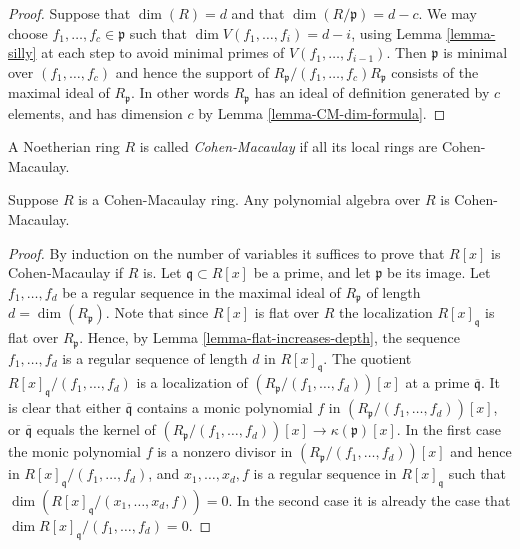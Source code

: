 \begin{proof}
Suppose that $\dim(R) = d$ and that $\dim(R/\mathfrak p) = d - c$.
We may choose $f_1, \ldots, f_c \in \mathfrak p$ such that
$\dim V(f_1, \ldots, f_i) = d - i$, using Lemma \ref{lemma-silly}
at each step to avoid minimal primes of $V(f_1, \ldots, f_{i-1})$.
Then $\mathfrak p$ is minimal over $(f_1, \ldots, f_c)$ and hence
the support of $R_{\mathfrak p}/(f_1, \ldots, f_c)R_{\mathfrak p}$ consists
of the maximal ideal of $R_{\mathfrak p}$. In other words
$R_{\mathfrak p}$ has an ideal of definition generated by
$c$ elements, and has dimension $c$ by Lemma \ref{lemma-CM-dim-formula}.
\end{proof}

\begin{definition}
\label{definition-ring-CM}
A Noetherian ring $R$ is called {\it Cohen-Macaulay} if all
its local rings are Cohen-Macaulay.
\end{definition}

\begin{lemma}
\label{lemma-CM-polynomial-algebra}
Suppose $R$ is a Cohen-Macaulay ring.
Any polynomial algebra over $R$ is Cohen-Macaulay.
\end{lemma}

\begin{proof}
By induction on the number of variables it suffices
to prove that $R[x]$ is Cohen-Macaulay if $R$ is.
Let $\mathfrak q \subset R[x]$ be a prime, and
let $\mathfrak p$ be its image.
Let $f_1, \ldots, f_d$ be a regular sequence
in the maximal ideal of $R_{\mathfrak p}$ of length
$d = \dim(R_{\mathfrak p})$. Note that since
$R[x]$ is flat over $R$ the localization
$R[x]_{\mathfrak q}$ is flat over $R_{\mathfrak p}$.
Hence, by Lemma \ref{lemma-flat-increases-depth}, the sequence
$f_1, \ldots, f_d$
is a regular sequence of length $d$ in $R[x]_{\mathfrak q}$.
The quotient $R[x]_{\mathfrak q}/(f_1, \ldots, f_d)$
is a localization of $(R_{\mathfrak p}/(f_1, \ldots, f_d))[x]$
at a prime $\overline{\mathfrak q}$. It is clear that
either $\overline{\mathfrak q}$ contains a monic
polynomial $f$ in $(R_{\mathfrak p}/(f_1, \ldots, f_d))[x]$,
or $\overline{\mathfrak q}$ equals the kernel of
$(R_{\mathfrak p}/(f_1, \ldots, f_d))[x] \to \kappa(\mathfrak p)[x]$.
In the first case the monic polynomial $f$ is a nonzero
divisor in $(R_{\mathfrak p}/(f_1, \ldots, f_d))[x]$ and hence
in $R[x]_{\mathfrak q}/(f_1, \ldots, f_d)$, and $x_1, \ldots, x_d, f$
is a regular sequence in $R[x]_{\mathfrak q}$
such that $\dim(R[x]_{\mathfrak q}/(x_1, \ldots, x_d, f)) = 0$.
In the second case it is already the case that
$\dim R[x]_{\mathfrak q}/(f_1, \ldots, f_d) = 0$.
\end{proof}



